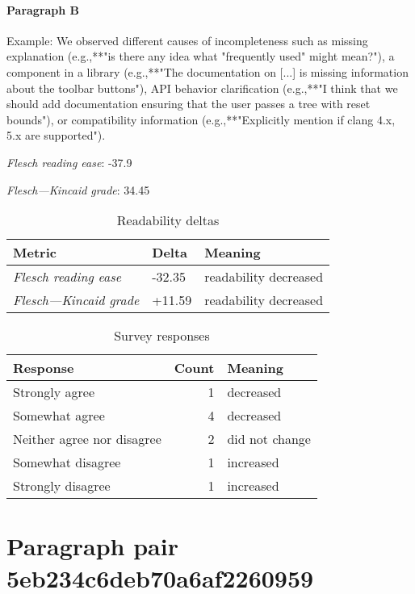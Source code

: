 \paragraph{Paragraph B}
Example: We observed different causes of incompleteness such as missing explanation (e.g.,**"is there any idea what "frequently used" might mean?"), a component in a library (e.g.,**"The documentation on [...] is missing information about the toolbar buttons"), API behavior clarification (e.g.,**"I think that we should add documentation ensuring that the user passes a tree with reset bounds"), or compatibility information (e.g.,**"Explicitly mention if clang 4.x, 5.x are supported").\par\medskip
\emph{Flesch reading ease}: -37.9\par
\emph{Flesch---Kincaid grade}: 34.45

\bigskip\begin{table}[!h]
\centering
\begin{tabular}{lll}
\toprule
               \textbf{Metric} & \textbf{Delta} &       \textbf{Meaning} \\
\midrule
    \emph{Flesch reading ease} &         -32.35 &  readability decreased \\
 \emph{Flesch---Kincaid grade} &         +11.59 &  readability decreased \\
\bottomrule
\end{tabular}
\caption*{Readability deltas}\end{table}

\begin{table}[!h]
\centering
\begin{tabular}{lrl}
\toprule
          \textbf{Response} &  \textbf{Count} & \textbf{Meaning} \\
\midrule
             Strongly agree &               1 &        decreased \\
             Somewhat agree &               4 &        decreased \\
 Neither agree nor disagree &               2 &   did not change \\
          Somewhat disagree &               1 &        increased \\
          Strongly disagree &               1 &        increased \\
\bottomrule
\end{tabular}
\caption*{Survey responses}\end{table}


\newpage
\section{Paragraph pair 5eb234c6deb70a6af2260959}
